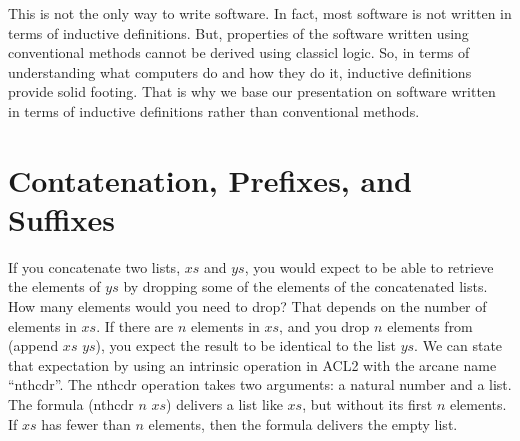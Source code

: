 This is not the only way to write software. 
In fact, most software is not written in terms of inductive definitions. 
But, properties of the software written using conventional methods cannot be derived using classicl logic. 
So, in terms of understanding what computers do and how they do it, 
inductive definitions provide solid footing. 
That is why we base our presentation on software written 
in terms of inductive definitions rather than conventional methods.


\section{Contatenation, Prefixes, and Suffixes}
\label{sec:append-prefix-suffix}

If you concatenate two lists, $xs$ and $ys$, you would expect to be able to retrieve the elements of $ys$ by dropping some of the elements of the concatenated lists. How many elements would you need to drop? That depends on the number of elements in $xs$. If there are $n$ elements in $xs$, and you drop $n$ elements from (append $xs$ $ys$), you expect the result to be identical to the list $ys$. We can state that expectation by using an intrinsic operation in ACL2 with the arcane name ``nthcdr''. The nthcdr operation takes two arguments: a natural number and a list. The formula (nthcdr $n$ $xs$) delivers a list like $xs$, but without its first $n$ elements. If $xs$ has fewer than $n$ elements, then the formula delivers the empty list.

\begin{comment}
ACL2 can prove this theorem, but the proof requires knowing something about the algebra of numbers. Fortunately, someone has worked out a basic theory of numeric algebra in ACL2 terms, and we can take advantage of that by importing it into our working environment. To do this, we use a command called ``include-book''. The name of the ``book'' with the theory we need is ``arithmetic/top'', and it resides in the ``system'' directory of ACL2.

\begin{lstlisting}
(include-book "arithmetic/top" :dir :system)
(defthmd append-suffix-thm
  (equal (nthcdr (len xs) (append xs ys))
         ys))
\end{lstlisting}

Let's see how we could prove this theorem. We would need to know some properties of the nthcdr operation. The following are three properties that are so easily believable, we are going to take them as axioms. The symbol $n$ stands for a natural number in these axioms. They would not be true if $n$ were, say, $-1$.
\end{comment}

